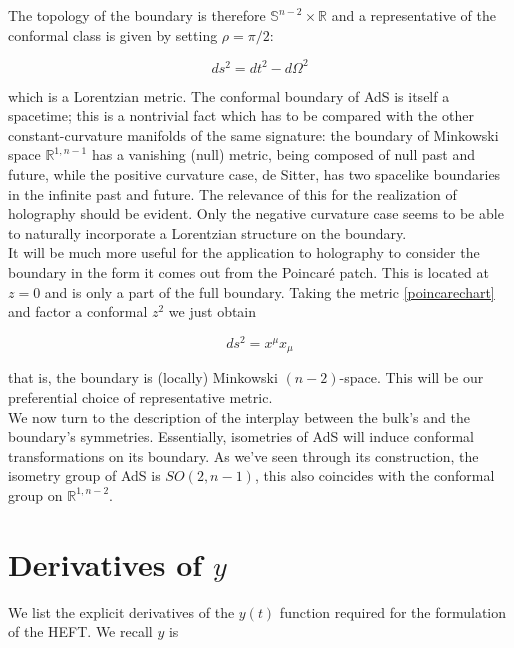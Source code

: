 The topology of the boundary is therefore $\mathbb{S}^{n-2} \times \mathbb{R}$ and a representative of the conformal class is given by setting $\rho = \pi/2$:

\begin{equation}
	ds^2 = dt^2 - d\Omega^2 
\end{equation}

which is a Lorentzian metric. The conformal boundary of AdS is itself a spacetime; this is a nontrivial fact which has to be compared with the other constant-curvature manifolds of the same signature: the boundary of Minkowski space $\mathbb{R}^{1,n-1}$ has a vanishing (null) metric, being composed of null past and future, while the positive curvature case, de Sitter, has two spacelike boundaries in the infinite past and future. The relevance of this for the realization of holography should be evident. Only the negative curvature case seems to be able to naturally incorporate a Lorentzian structure on the boundary.\\

It will be much more useful for the application to holography to consider the boundary in the form it comes out from the Poincaré patch. This is located at $z=0$ and is only a part of the full boundary. Taking the metric \ref{poincarechart} and factor a conformal $z^2$ we just obtain

\begin{equation}
	ds^2 = x^\mu x_\mu
\end{equation}

that is, the boundary is (locally) Minkowski $(n-2)$-space. This will be our preferential choice of representative metric.\\

We now turn to the description of the interplay between the bulk's and the boundary's symmetries. Essentially, isometries of AdS will induce conformal transformations on its boundary. As we've seen through its construction, the isometry group of AdS is $SO(2,n-1)$, this also coincides with the conformal group on $\mathbb{R}^{1,n-2}$.


\section{Derivatives of $y$}\label{sec:yderivatives}

We list the explicit derivatives of the $y(t)$ function required for the formulation of the HEFT. We recall $y$ is

